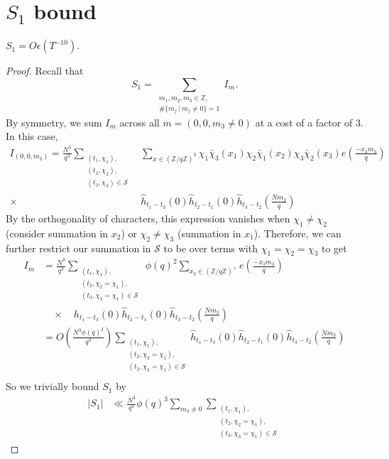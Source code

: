 \section{$S_1$ bound}
\begin{proposition}\label{s1bound}
    $S_1=O\epsilon(T^{-10})$.
\end{proposition}
\begin{proof}
    Recall that \[
    S_1=\sum_{\substack{m_1,m_2,m_3\in \mathbb{Z},\\
    \#\{m_j \ | \ m_j\neq 0\}=1}} I_m.\]
By symmetry, we sum $I_m$ across all $m=(0,0,m_3\neq 0)$ at a cost of a factor of $3$.
In this case, \begin{align*}
    I_{(0,0,m_3)}=\frac{N^3}{q^3}\sum_{\substack{(t_1,\chi_1),\\(t_2,\chi_2),\\(t_3,\chi_3)\in\mathcal{S}}} &\sum_{x\in (\mathbb{Z}/q\mathbb{Z})^3}\chi_1\bar{\chi}_3(x_1)\chi_2\bar{\chi}_1(x_2)\chi_3\bar{\chi}_2(x_3) e\left(\frac{-x_3 m_3}{q}\right)\\
    \times \ &\hat{h}_{t_1-t_3}\left(0\right)\hat{h}_{t_2-t_1}\left(0\right)\hat{h}_{t_3-t_2}\left(\frac{Nm_3}{q}\right)
\end{align*}
By the orthogonality of characters, this expression vanishes when $\chi_1\neq \chi_2$ (consider summation in $x_2$) or $\chi_2\neq \chi_3$ (summation in $x_1$). Therefore, we can further restrict our summation in $\mathcal{S}$ to be over terms with $\chi_1=\chi_2=\chi_3$ to get \begin{align*}
    I_m&=\frac{N^3}{q^3}\sum_{\substack{(t_1,\chi_1),\\(t_2,\chi_2=\chi_1),\\(t_3,\chi_3=\chi_1)\in\mathcal{S}}} \ \phi(q)^2 \sum_{x_3\in (\mathbb{Z}/q\mathbb{Z})^{\times}}e\left(\frac{-x_3 m_3}{q}\right)\\
   & \quad  \times  \quad {h}_{t_1-t_3}\left(0\right)\hat{h}_{t_2-t_1}\left(0\right)\hat{h}_{t_3-t_2}\left(\frac{Nm_3}{q}\right)\\
   &=O\left(\frac{N^3\phi(q)^3}{q^3}\right) \sum_{\substack{(t_1,\chi_1),\\(t_2,\chi_2=\chi_1),\\(t_3,\chi_3=\chi_1)\in\mathcal{S}}} \hat{h}_{t_1-t_3}\left(0\right)\hat{h}_{t_2-t_1}\left(0\right)\hat{h}_{t_3-t_2}\left(\frac{Nm_3}{q}\right)\\
\end{align*}
So we trivially bound $S_1$ by\begin{align*}
    |S_1|&\ll  \frac{N^3}{q^3} \phi(q)^3 \sum_{m_3\neq 0}\sum_{\substack{(t_1,\chi_1),\\(t_2,\chi_2=\chi_1),\\(t_3,\chi_3=\chi_1)\in\mathcal{S}}}

\end{align*}
\end{proof}
